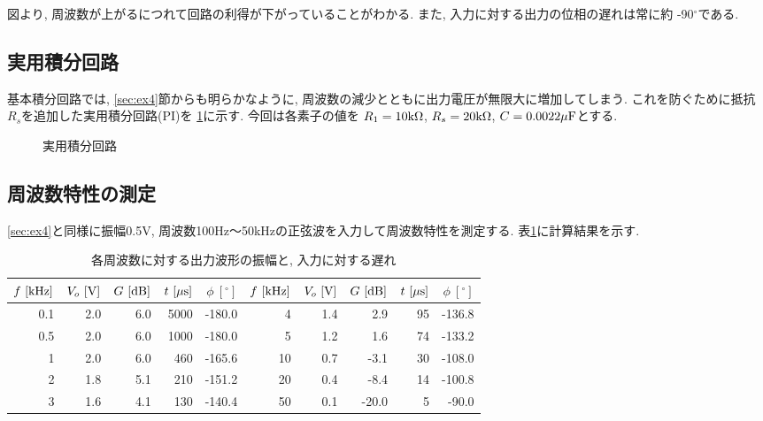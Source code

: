 \documentclass[titlepage]{jsarticle}
\begin{document}
            図より, 周波数が上がるにつれて回路の利得が下がっていることがわかる.
            また, 入力に対する出力の位相の遅れは常に約 -90$^\circ$である.

    \subsection{実用積分回路}
        基本積分回路では, \ref{sec:ex4}節からも明らかなように,
        周波数の減少とともに出力電圧が無限大に増加してしまう.
        これを防ぐために抵抗$R_s$を追加した実用積分回路(PI)を
        \ref{fig:nice-int}に示す.
        今回は各素子の値を
        $R_1 = 10\rm{k\Omega}$,
        $R_s = 20\rm{k\Omega}$, $C = 0.0022\rm{\mu F}$とする.

        \begin{figure}[h]
            \centering
            \caption{実用積分回路}
            \label{fig:nice-int}
        \end{figure}

        \subsection{周波数特性の測定} \label{sec:ex5}
            \ref{sec:ex4}と同様に振幅0.5V,
            周波数100Hz〜50kHzの正弦波を入力して周波数特性を測定する.
            表\ref{tab:nice-int}に計算結果を示す.

            \begin{table}[h]
                \caption{各周波数に対する出力波形の振幅と, 入力に対する遅れ}
                \label{tab:nice-int}
                \centering
                \begin{tabular}{r|rr|rr||r|rr|rr}
                    $f \ [\rm{kHz}]$ & $V_o \ [\rm{V]}$ & $G \ [\rm{dB}]$ & $t \ [\mu\rm{s}]$ & $\phi \ [^\circ]$ & $f \ [\rm{kHz}]$ & $V_o \ [\rm{V]}$ & $G \ [\rm{dB}]$ & $t \ [\mu\rm{s}]$ & $\phi \ [^\circ]$ \\ \hline \hline
                    0.1 & 2.0 & 6.0 & 5000 & -180.0 & 4 & 1.4 & 2.9 & 95 & -136.8 \\
                    0.5 & 2.0 & 6.0 & 1000 & -180.0 & 5 & 1.2 & 1.6 & 74 & -133.2 \\
                    1 & 2.0 & 6.0 & 460 & -165.6 & 10 & 0.7 & -3.1 & 30 & -108.0 \\
                    2 & 1.8 & 5.1 & 210 & -151.2 & 20 & 0.4 & -8.4 & 14 & -100.8 \\
                    3 & 1.6 & 4.1 & 130 & -140.4 & 50 & 0.1 & -20.0 & 5 & -90.0 \\
                \end{tabular}
            \end{table}
\end{document}
